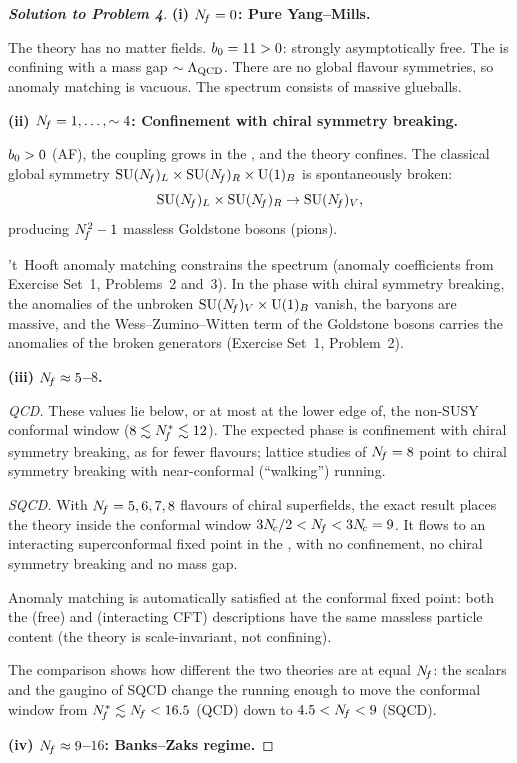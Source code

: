\documentclass[11pt,a4paper]{article}
\begin{document}
\begin{proof}[\textbf{Solution to Problem 4}]
\textbf{(i) $N_{\!f} = 0$: Pure Yang--Mills.}

The theory has no matter fields.  $b_0 = 11 > 0$: strongly asymptotically
free.  The \IR{} is confining with a mass gap $\sim \Lambda_{\mathrm{QCD}}$.
There are no global flavour symmetries, so anomaly matching is vacuous.
The spectrum consists of massive glueballs.

\textbf{(ii) $N_{\!f} = 1,\ldots,\sim 4$: Confinement with chiral symmetry
breaking.}

$b_0 > 0$ (AF), the coupling grows in the \IR, and the theory confines.
The classical global symmetry $\mathrm{SU}(N_{\!f})_L \times \mathrm{SU}(N_{\!f})_R \times
\mathrm{U}(1)_B$ is spontaneously broken:
\[
  \mathrm{SU}(N_{\!f})_L \times \mathrm{SU}(N_{\!f})_R \to \mathrm{SU}(N_{\!f})_V,
\]
producing $N_{\!f}^2 - 1$ massless Goldstone bosons (pions).

't~Hooft anomaly matching constrains the \IR{} spectrum (anomaly
coefficients from Exercise Set~1, Problems~2 and~3).  In the phase with
chiral symmetry breaking, the anomalies of the unbroken
$\mathrm{SU}(N_{\!f})_V \times \mathrm{U}(1)_B$ vanish, the baryons are massive, and the
Wess--Zumino--Witten term of the Goldstone bosons carries the anomalies
of the broken generators (Exercise Set~1, Problem~2).

\textbf{(iii) $N_{\!f} \approx 5$--$8$.}

\emph{QCD.}  These values lie below, or at most at the lower edge of, the
non-SUSY conformal window ($8 \lesssim N_{\!f}^* \lesssim 12$).  The
expected \IR{} phase is confinement with chiral symmetry breaking, as for
fewer flavours; lattice studies of $N_{\!f} = 8$ point to chiral symmetry
breaking with near-conformal (``walking'') running.

\emph{SQCD.}  With $N_{\!f} = 5,6,7,8$ flavours of chiral superfields, the
exact result places the theory inside the conformal window
$3N_{\!c}/2 < N_{\!f} < 3N_{\!c} = 9$.  It flows to an interacting superconformal
fixed point in the \IR{}, with no confinement, no chiral symmetry
breaking and no mass gap.

Anomaly matching is automatically satisfied at the conformal fixed point:
both the \UV{} (free) and \IR{} (interacting CFT) descriptions have the
same massless particle content (the theory is scale-invariant, not confining).

The comparison shows how different the two theories are at equal
$N_{\!f}$: the scalars and the gaugino of SQCD change the running enough
to move the conformal window from $N_{\!f}^* \lesssim N_{\!f} < 16.5$ (QCD) down
to $4.5 < N_{\!f} < 9$ (SQCD).

\textbf{(iv) $N_{\!f} \approx 9$--$16$: Banks--Zaks regime.}


\end{proof}
\end{document}
